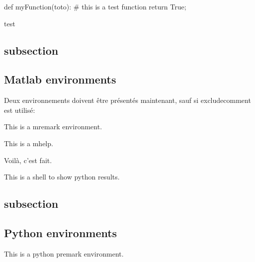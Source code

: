 \documentclass[11pt,table]{book}
\begin{document}
\begin{python}
def myFunction(toto):
	# this is a test function
	return True;
\end{python}

\begin{mwindow}
 test
\end{mwindow}

\subsection{subsection}
\subsection{Matlab environments}
Deux environnements doivent être présentés maintenant, sauf si excludecomment est utilisé:

\begin{mcomment}

\begin{mremark}
This is a \matlabregistered{} mremark environment.
\end{mremark}

\end{mcomment}

\begin{mhelp}
This is a \matlabregistered{} mhelp. 

\lipsum[1-2]
\end{mhelp}


Voilà, c'est fait.

\begin{sh}
This is a shell to show python results.
\end{sh}
 
\subsection{subsection}
\subsection{Python environments}

\begin{pcomment}

\begin{premark}
This is a python premark environment.
\end{premark}

\end{pcomment}
\end{document}

